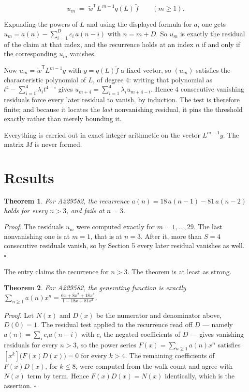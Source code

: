 \documentclass[11pt]{article}
\newtheorem{theorem}{Theorem}
\theoremstyle{definition}
\begin{document}
\[u_m \;=\; \tilde w^{\mathsf T} L^{\,m-1} q(L)\,\tilde f \qquad (m \ge 1).\]

Expanding the powers of $L$ and using the displayed formula for $a$, one gets $u_m = a(n) - \sum_{i=1}^{D} c_i\,a(n-i)$ with $n = m + D$. So $u_m$ is exactly the residual of the claim at that index, and the recurrence holds at an index $n$ if and only if the corresponding $u_m$ vanishes.

Now $u_m = \tilde w^{\mathsf T} L^{m-1} y$ with $y = q(L)\tilde f$ a fixed vector, so $(u_m)$ satisfies the characteristic polynomial of $L$, of degree $4$: writing that polynomial as $t^{4} - \sum_{i=1}^{4} \lambda_i t^{4-i}$ gives $u_{m+4} = \sum_{i=1}^{4} \lambda_i u_{m+4-i}$. Hence $4$ consecutive vanishing residuals force every later residual to vanish, by induction. The test is therefore finite; and because it locates the {\itshape last} nonvanishing residual, it pins the threshold exactly rather than merely bounding it.

Everything is carried out in exact integer arithmetic on the vector $L^{m-1}y$. The matrix $M$ is never formed.

\section{Results}

\begin{theorem} For A229582, the recurrence $a(n) = 18\,a(n-1) - 81\,a(n-2)$ holds for every $n > 3$, and fails at $n = 3$.\end{theorem}

{\itshape Proof.} The residuals $u_m$ were computed exactly for $m = 1,\dots,29$. The last nonvanishing one is at $m = 1$, that is at $n = 3$. After it, more than $S = 4$ consecutive residuals vanish, so by Section 5 every later residual vanishes as well. $\square$

The entry claims the recurrence for $n > 3$. The theorem is at least as strong.

\begin{theorem} For A229582, the generating function is exactly $\sum_{n\ge 1} a(n)x^n = \frac{6x + 8x^{2} + 18x^{3}}{1 - 18x + 81x^{2}}$.\end{theorem}

{\itshape Proof.} Let $N(x)$ and $D(x)$ be the numerator and denominator above, $D(0)=1$. The residual test applied to the recurrence read off $D$ --- namely $a(n) = \sum_i c_i a(n-i)$ with $c_i$ the negated coefficients of $D$ --- gives vanishing residuals for every $n > 3$, so the power series $F(x)=\sum_{n\ge 1}a(n)x^n$ satisfies $[x^k]\bigl(F(x)D(x)\bigr) = 0$ for every $k > 4$. The remaining coefficients of $F(x)D(x)$, for $k \le 8$, were computed from the walk count and agree with $N(x)$ term by term. Hence $F(x)D(x) = N(x)$ identically, which is the assertion. $\square$
\end{document}
